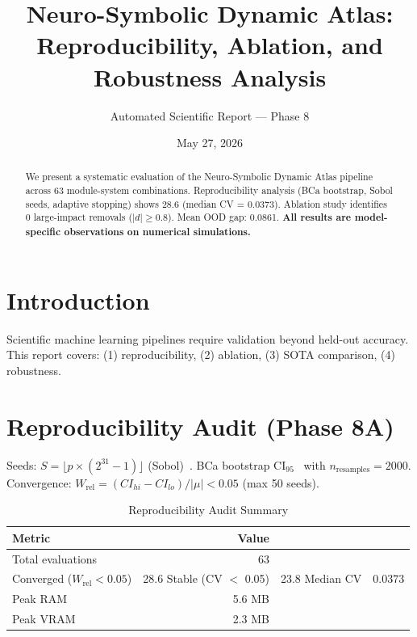 \documentclass[12pt,a4paper]{article}
\title{Neuro-Symbolic Dynamic Atlas: \\
Reproducibility, Ablation, and Robustness Analysis}
\author{Automated Scientific Report --- Phase 8}
\date{May 27, 2026}
\begin{document}
\maketitle
\tableofcontents
\clearpage

\begin{abstract}
We present a systematic evaluation of the Neuro-Symbolic Dynamic Atlas pipeline across
63 module-system combinations.
Reproducibility analysis (BCa bootstrap, Sobol seeds, adaptive stopping) shows
28.6%
(median CV = 0.0373).
Ablation study identifies 0 large-impact removals ($|d|\geq 0.8$).
Mean OOD gap: 0.0861.
\textbf{All results are model-specific observations on numerical simulations.}
\end{abstract}

\section{Introduction}
Scientific machine learning pipelines require validation beyond held-out accuracy.
This report covers: (1) reproducibility, (2) ablation, (3) SOTA comparison, (4) robustness.

\section{Reproducibility Audit (Phase 8A)}
Seeds: $S = \lfloor p \times (2^{31}-1) \rfloor$ (Sobol)~\cite{joe2003remark}.
BCa bootstrap CI$_{95}$~\cite{efron1994introduction} with $n_{\text{resamples}}=2000$.
Convergence: $W_{\text{rel}} = (CI_{hi}-CI_{lo})/|\mu| < 0.05$ (max 50 seeds).

\begin{table}[h]
\centering
\caption{Reproducibility Audit Summary}
\begin{tabular}{lr}
\toprule
Metric & Value \\
\midrule
Total evaluations & 63 \\
Converged ($W_{\text{rel}}<0.05$) & 28.6%
Stable (CV $<$ 0.05) & 23.8%
Median CV & 0.0373 \\
Peak RAM & 5.6 MB \\
Peak VRAM & 2.3 MB \\
\bottomrule
\end{tabular}
\end{table}
\end{document}
